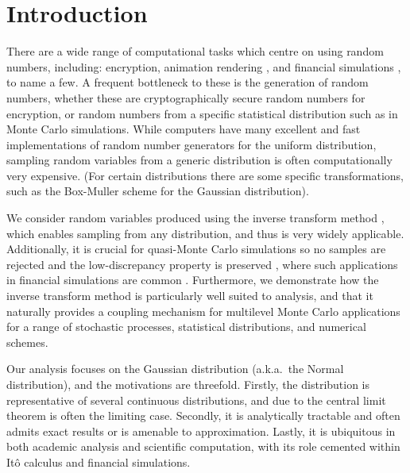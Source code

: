 \documentclass[manuscript,review]{acmart}
\begin{document}
\maketitle

\section{Introduction}
\label{sec:introduction}

There are a wide range of computational tasks which centre on using random numbers, including: encryption, animation rendering \citep{lee2017vectorized}, and financial simulations \citep{glasserman2013monte}, to name a few. A frequent bottleneck to these is the generation of random numbers, whether these are cryptographically secure random numbers for encryption, or random numbers from a specific statistical distribution such as in Monte Carlo simulations.  While computers have many excellent and fast implementations of random number generators for the uniform distribution, sampling random variables from a generic distribution is often computationally very expensive. (For certain distributions there are some specific transformations, such as the Box-Muller scheme \citep{box1958note} for the Gaussian distribution). 

We consider random variables produced using the inverse transform method \citep{glasserman2013monte}, which enables sampling from any distribution, and thus is very widely applicable. Additionally, it is crucial for quasi-Monte Carlo simulations \citep{giles2009multilevel_qmc,lecuyer2016randomized} so no samples are rejected and the low-discrepancy property is preserved \citep{tezuka1995uniform}, where such applications in financial simulations are common \citep{joy1996quasi,xu2015high}. Furthermore, we demonstrate how the inverse transform method is particularly well suited to analysis, and that it naturally provides a coupling mechanism for multilevel Monte Carlo applications for a range of stochastic processes, statistical distributions, and numerical schemes. 

Our analysis focuses on the Gaussian distribution (a.k.a.\ the Normal distribution), and the motivations are threefold. Firstly, the distribution is representative of several continuous distributions, and due to the central limit theorem is often the limiting case. Secondly, it is analytically tractable and often admits exact results or is amenable to approximation. Lastly, it is ubiquitous in both academic analysis and scientific computation, with its role cemented within It\^{o} calculus and financial simulations. 
\end{document}
